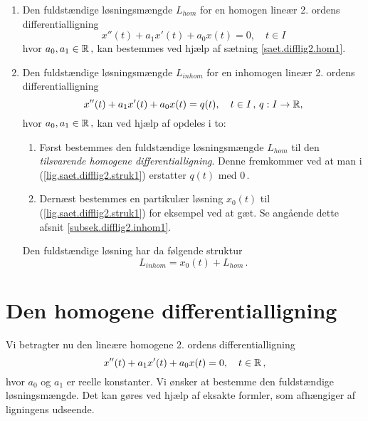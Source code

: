 \begin{method} \label{saet.difflig2.struk1}
\begin{enumerate}
\item
Den fuldstændige løsningsmængde $L_{hom}$ for en homogen lineær 2. ordens differentialligning
\begin{equation}
x''(t) + a_1x'(t) + a_0x(t) = 0, \quad t \in I \label{lig.saet.difflig2.struk1}
\end{equation}
hvor $ a_0, a_1 \in \mathbb{R}\,,$ kan bestemmes ved hjælp af sætning \ref{saet.difflig2.hom1}.
\item
Den fuldstændige løsningsmængde $ L_{inhom} $ for en inhomogen lineær 2. ordens differentialligning
\begin{equation}
x''(t) + a_1x'(t) + a_0x(t) = q(t), \quad t \in I\,,\, q : I \rightarrow \mathbb{R}, \label{lig.saet.difflig2.struk1}
\end{equation}
hvor $ a_0, a_1 \in \mathbb{R}\,,$ kan ved hjælp af  opdeles i to:
\begin{enumerate}
\item Først bestemmes den fuldstændige løsningsmængde $ L_{hom} $ til den \textit{tilsvarende homogene differentialligning}. Denne fremkommer ved at man i (\ref{lig.saet.difflig2.struk1}) erstatter $q(t)$ med $0\,$.
\item Dernæst bestemmes en partikulær løsning $ x_0(t) $ til (\ref{lig.saet.difflig2.struk1}) for eksempel ved at gæt. Se angående dette afsnit \ref{subsek.difflig2.inhom1}.
\end{enumerate}
Den fuldstændige løsning har da følgende struktur
\begin{equation}
L_{inhom} = x_0(t) + L_{hom}\,.
\end{equation}
\end{enumerate}
\end{method}


\section{Den homogene differentialligning} \label{subsek.difflig2.hom1}

Vi betragter nu den lineære homogene 2. ordens differentialligning 
\begin{equation}
x''(t) + a_1x'(t) + a_0x(t) = 0, \quad t \in \mathbb{R} \,, 
\end{equation}
hvor $a_0$ og $a_1$ er reelle konstanter. Vi ønsker at bestemme den fuldstændige løsningsmængde. Det kan gøres ved hjælp af eksakte formler, som afhængiger af ligningens udseende.

